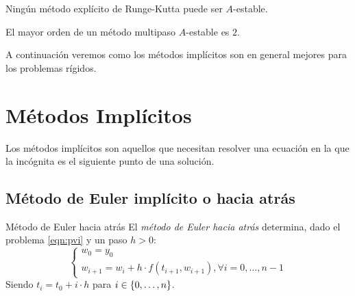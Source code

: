
\begin{theorem}
    Ningún método explícito de Runge-Kutta puede ser $A$-estable.
\end{theorem}


\begin{theorem}
    El mayor orden de un método multipaso $A$-estable es $2$.
\end{theorem}

A continuación veremos como los métodos implícitos son en general
mejores para los problemas rígidos.

\section{Métodos Implícitos}

Los métodos implícitos son aquellos que
necesitan resolver una ecuación en la que la incógnita
es el siguiente punto de una solución.

\subsection{Método de Euler implícito o hacia atrás}

\begin{method}{Método de Euler hacia atrás}
    El \emph{método de Euler hacia atrás} determina,
    dado el problema \ref{eqn:pvi} y un paso $h > 0$:
    \begin{equation}\label{eqn:backwardseulersol}
    \begin{cases}
        w_0 = y_0 \\
        w_{i+1} = w_i + h\cdot f(t_{i+1}, w_{i+1}), \forall i=0,\dots, n-1
    \end{cases}
    \end{equation}
    Siendo $t_i = t_0 + i\cdot h$ para $i \in \qty{0,\ldots, n}$.
\end{method}


